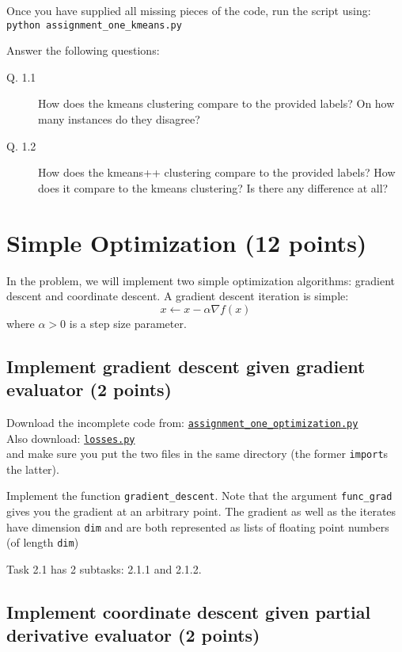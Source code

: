 \documentclass{article}
\begin{document}
Once you have supplied all missing pieces of the code, run the script using:\\
{\tt python assignment\_one\_kmeans.py}

Answer the following questions:
\begin{description}
\item[Q. 1.1]
How does the kmeans clustering compare to the provided labels? On how many instances do they disagree?
\item[Q. 1.2]
How does the kmeans++ clustering compare to the provided labels? How does it compare to the kmeans clustering? Is there any difference at all?
\end{description}


\section{Simple Optimization (12 points)}

In the problem, we will implement two simple optimization algorithms: gradient descent and coordinate descent. A gradient descent iteration is simple:
\[
x \gets x - \alpha \nabla f(x)
\]
where $\alpha > 0$ is a step size parameter.

\subsection{Implement gradient descent given gradient evaluator (2 points)}

Download the incomplete code from:
\href{https://github.com/ambujtewari/stats607a-fall2014/blob/master/homeworks/assignment_one_optimization.py}{\tt assignment\_one\_optimization.py} \\
Also download:
\href{https://github.com/ambujtewari/stats607a-fall2014/blob/master/homeworks/losses.py}{\tt losses.py} \\
and make sure you put the two files in the same directory (the former {\tt import}s the latter).

Implement the function {\tt gradient\_descent}. Note that the argument {\tt func\_grad} gives you the gradient at an arbitrary point. The gradient 
as well as the iterates have dimension {\tt dim} and are both represented as lists of floating point numbers (of length {\tt dim})

Task 2.1 has 2 subtasks: 2.1.1 and 2.1.2.

\subsection{Implement coordinate descent given partial derivative evaluator (2 points)}
\end{document}
